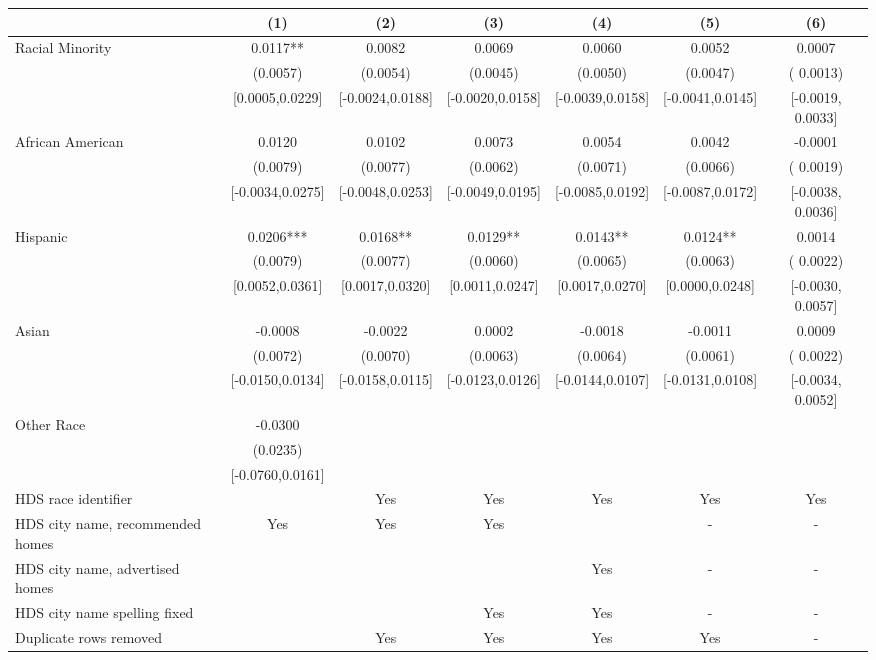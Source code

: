 \begin{table}[htbp]
{\begin{tabular}{l*{6}{c}}
                    \cmidrule(lr){2-2}\cmidrule(lr){3-3}\cmidrule(lr){4-4}\cmidrule(lr){5-5}\cmidrule(lr){6-6}\cmidrule(lr){7-7}
                    &\multicolumn{1}{c}{(1)}   &\multicolumn{1}{c}{(2)}   &\multicolumn{1}{c}{(3)}   &\multicolumn{1}{c}{(4)}   &\multicolumn{1}{c}{(5)}   &\multicolumn{1}{c}{(6)}\\
\midrule
Racial Minority & 0.0117** & 0.0082 & 0.0069 & 0.0060 & 0.0052 & 0.0007 \\
 & (0.0057) & (0.0054) & (0.0045) & (0.0050) & (0.0047) & ( 0.0013) \\
 & [0.0005,0.0229] & [-0.0024,0.0188] & [-0.0020,0.0158] & [-0.0039,0.0158] & [-0.0041,0.0145] & [-0.0019,  0.0033] \\
\midrule
African American & 0.0120 & 0.0102 & 0.0073 & 0.0054 & 0.0042 & -0.0001 \\
 & (0.0079) & (0.0077) & (0.0062) & (0.0071) & (0.0066) & ( 0.0019) \\
 & [-0.0034,0.0275] & [-0.0048,0.0253] & [-0.0049,0.0195] & [-0.0085,0.0192] & [-0.0087,0.0172] & [-0.0038,  0.0036] \\
Hispanic & 0.0206*** & 0.0168** & 0.0129** & 0.0143** & 0.0124** & 0.0014 \\
 & (0.0079) & (0.0077) & (0.0060) & (0.0065) & (0.0063) & ( 0.0022) \\
 & [0.0052,0.0361] & [0.0017,0.0320] & [0.0011,0.0247] & [0.0017,0.0270] & [0.0000,0.0248] & [-0.0030,  0.0057] \\
Asian & -0.0008 & -0.0022 & 0.0002 & -0.0018 & -0.0011 & 0.0009 \\
 & (0.0072) & (0.0070) & (0.0063) & (0.0064) & (0.0061) & ( 0.0022) \\
 & [-0.0150,0.0134] & [-0.0158,0.0115] & [-0.0123,0.0126] & [-0.0144,0.0107] & [-0.0131,0.0108] & [-0.0034,  0.0052] \\
Other Race & -0.0300 &  &  &  &  &  \\
 & (0.0235) &  &  &  &  &  \\
 & [-0.0760,0.0161] &  &  &  &  &  \\
\midrule
HDS race identifier & & Yes & Yes & Yes & Yes & Yes \\
HDS city name, recommended homes & Yes & Yes & Yes & & - & -\\
HDS city name, advertised homes &  &  &  & Yes & - & -\\
HDS city name spelling fixed & & & Yes & Yes & - & -\\
Duplicate rows removed &  & Yes & Yes & Yes & Yes & - \\

\end{tabular}}
\end{table}
